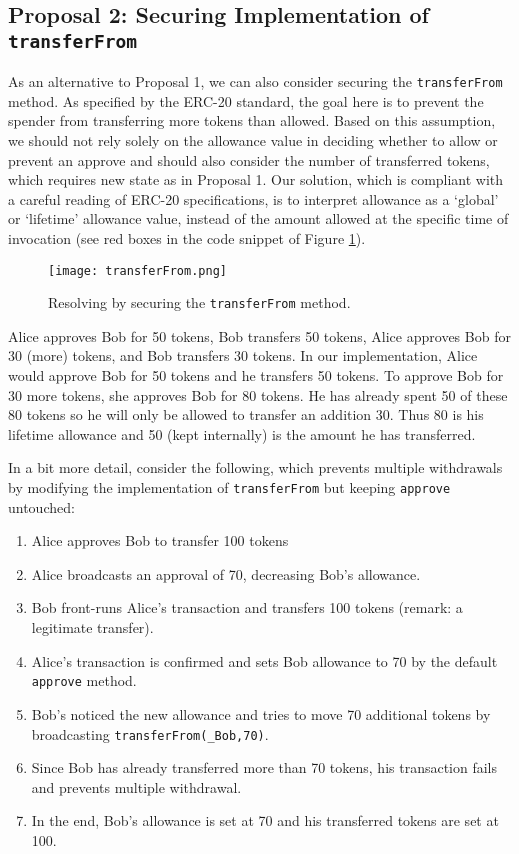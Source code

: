 \subsection{Proposal 2: Securing Implementation of \texttt{transferFrom}}\label{subsec:prop2}
As an alternative to Proposal 1, we can also consider securing the \texttt{transferFrom} method. As specified by the ERC-20 standard, the goal here is to prevent the spender from transferring more tokens than allowed. Based on this assumption, we should not rely solely on the allowance value in deciding whether to allow or prevent an approve and should also consider the number of transferred tokens, which requires new state as in Proposal 1. Our solution, which is compliant with a careful reading of ERC-20 specifications, is to interpret allowance as a `global' or `lifetime' allowance value, instead of the amount allowed at the specific time of invocation (see red boxes in the code snippet of Figure \ref{fig:transfer}). 

\begin{figure}[t]
	\centering
	\texttt{[image: transferFrom.png]}
	\caption[Resolving \mwa in \texttt{transferFrom}]{Resolving \mwa by securing the \texttt{transferFrom} method.}
	\label{fig:transfer}
\end{figure}

\begin{example}
	Alice approves Bob for 50 tokens, Bob transfers 50 tokens, Alice approves Bob for 30 (more) tokens, and Bob transfers 30 tokens. In our implementation, Alice would approve Bob for 50 tokens and he transfers 50 tokens. To approve Bob for 30 more tokens, she approves Bob for 80 tokens. He has already spent 50 of these 80 tokens so he will only be allowed to transfer an addition 30. Thus 80 is his lifetime allowance and 50 (kept internally) is the amount he has transferred. 
\end{example}

In a bit more detail, consider the following, which prevents multiple withdrawals by modifying the implementation of \texttt{transferFrom} but keeping \texttt{approve} untouched:
\begin{enumerate}
	\item Alice approves Bob to transfer 100 tokens
	\item Alice broadcasts an approval of 70, decreasing Bob's allowance.
	\item Bob front-runs Alice’s transaction and transfers 100 tokens (remark: a legitimate transfer).
	\item Alice's transaction is confirmed and sets Bob allowance to 70 by the default \texttt{approve} method.
	\item Bob's noticed the new allowance and tries to move 70 additional tokens by broadcasting \texttt{transferFrom(\_Bob,70)}. 
	\item Since Bob has already transferred more than 70 tokens, his transaction fails and prevents multiple withdrawal. 
	\item In the end, Bob’s allowance is set at 70 and his transferred tokens are set at 100.
\end{enumerate}

